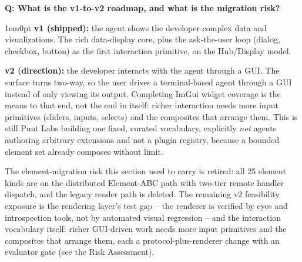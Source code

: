 \documentclass[11pt,letterpaper]{article}
\newcounter{faqnum}
\newenvironment{faqpair}[1]{%
  \needspace{4\baselineskip}%
  \vspace{0.5em}%
  \refstepcounter{faqnum}%
  \noindent\textbf{\color{SectionBlue}Q\thefaqnum: #1}\par\nopagebreak[4]%
  \vspace{0.2em}%
  \begin{adjustwidth}{1em}{0pt}%
  \setlength{\parindent}{0pt}%
}{%
  \end{adjustwidth}%
  \vspace{0.5em}%
}
\begin{document}
\begin{faqpair}{What is the v1-to-v2 roadmap, and what is the migration risk?}\label{faq:roadmap}
  \textbf{v1 (shipped):} the agent shows the developer complex data and
  visualizations. The rich data-display core, plus the ask-the-user loop
  (dialog, checkbox, button) as the first interaction primitive, on the
  Hub/Display model.

  \textbf{v2 (direction):} the developer interacts with the agent through a GUI.
  The surface turns two-way, so the user drives a terminal-based agent through a GUI
  instead of only viewing its output. Completing ImGui widget coverage is the
  means to that end, not the end in itself: richer interaction needs more input
  primitives (sliders, inputs, selects) and the composites that arrange them.
  This is still Punt Labs building one fixed, curated vocabulary, explicitly
  \emph{not} agents authoring arbitrary extensions and not a plugin registry,
  because a bounded element set already composes without limit.

  The element-migration risk this section used to carry is retired: all 25
  element kinds are on the distributed Element-ABC path with two-tier remote
  handler dispatch, and the legacy render path is deleted. The remaining
  v2 feasibility exposure is the rendering layer's test gap -- the renderer is
  verified by eyes and introspection tools, not by automated visual regression
  -- and the interaction vocabulary itself: richer GUI-driven work needs more
  input primitives and the composites that arrange them, each a
  protocol-plus-renderer change with an evaluator gate (see the Risk
  Assessment).
\end{faqpair}
\end{document}
